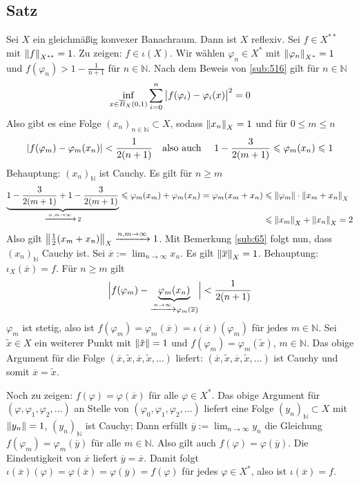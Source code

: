 \subsection[Satz: Gleichmäßig konvexe Banachräume sind reflexiv]{Satz} %
\label{sub:69}
Sei $X$ ein gleichmäßig konvexer Banachraum. Dann ist $X$ reflexiv.
Sei $f \in X^{**}$ mit $\norm[X^{**}]{f}=1$. Zu zeigen: $f \in \iota(X)$. Wir wählen $\varphi_n \in X^*$ mit $\norm[X^*]{\varphi_n}=1$ und $f(\varphi_n) > 1- \frac{1}{n+1}$
für $n \in \mathds{N}$. Nach dem Beweis von \ref{sub:516} gilt für $n \in \mathds{N}$
\[
	\inf_{x \in \overline{B}_X(0,1) } \sum_{i=0}^{n} \,\abs[\big]{f(\varphi_i) - \varphi_i(x)}^2 =0
\]
Also gibt es eine Folge $(x_n)_{n \in \mathds{N}} \subset X$, sodass $\norm[X]{x_n}=1$ und für $0 \le m \le n$
\[
	\abs*{f(\varphi_m)- \varphi_m(x_n)} < \frac{1}{2(n+1)} \quad \text{also auch } \quad 1- \frac{3}{2(m+1)}\le \varphi_m(x_n) \le 1
\]
Behauptung: $(x_n)_\mathds{N}$ ist Cauchy. Es gilt für $n \ge m$
\begin{align*}
	\underbrace{1- \frac{3}{2(m+1)}  + 1 - \frac{3}{2(m+1)}}_{\xrightarrow{n,m \to \infty}\, 2} \le \varphi_m(x_m) + \varphi_m(x_n) = \varphi_m(x_m+x_n) &\le \norm{\varphi_m} \cdot \norm[X]{x_m+x_n} \\[-1.2em]
	&\le \norm[X]{x_m} + \norm[X]{x_n} = 2  
\end{align*}
Also gilt $ \norm[X]{\frac{1}{2} (x_m+x_n)} \xrightarrow{n,m \to \infty} 1$. Mit Bemerkung \ref{sub:65} folgt nun, dass $(x_n)_\mathds{N}$ Cauchy ist. Sei 
$\overline{x} := \lim_{ n \to \infty} x_n$. Es gilt $\norm[X]{\overline{x}}=1$. Behauptung: $\iota_X(\overline{x})=f$. Für $n \ge m$ gilt
\begin{align*}
	\abs[\Big]{f(\varphi_m) - \underbrace{\varphi_m(x_n)}_{\xrightarrow{n \to \infty} \varphi_m(\overline{x} )}} < \frac{1}{2(n+1)}  
\end{align*}
$\varphi_m$ ist stetig, also ist $f(\varphi_m)=\varphi_m(\overline{x})= \iota(\overline{x})(\varphi_m)$ für jedes $m \in\mathds{N}$. Sei $\tilde{x} \in X$ ein weiterer Punkt
mit $\norm{\tilde{x}}=1$ und $f(\varphi_m) = \varphi_m(\tilde{x})$, $m \in \mathds{N}$. Das obige Argument für die Folge 
$(\overline{x}, \tilde{x}, \overline{x}, \tilde{x}, \ldots)$ liefert: $(\overline{x}, \tilde{x}, \overline{x}, \tilde{x}, \ldots)$ ist Cauchy und somit
$\overline{x}=\tilde{x}$.

Noch zu zeigen: $f(\varphi)= \varphi(\overline{x})$ für alle $\varphi \in X^*$. Das obige Argument für $(\varphi, \varphi_1, \varphi_2, \ldots )$ an Stelle von
$(\varphi_0, \varphi_1, \varphi_2,\ldots )$ liefert eine Folge $(y_n)_\mathds{N} \subset X$ mit $\norm{y_n}=1$, $(y_n)_\mathds{N}$ ist Cauchy; 
Dann erfüllt $\overline{y} := \lim_{ n \to \infty} y_n$ die Gleichung $f(\varphi_m)=\varphi_m(\overline{y})$ für alle $m \in \mathds{N}$. Also gilt auch 
$f(\varphi)=\varphi(\overline{y})$. Die Eindeutigkeit von $\overline{x}$ liefert $ \overline{y}=\overline{x}$. Damit folgt 
$\iota(\overline{x})(\varphi)= \varphi(\overline{x})= \varphi(\overline{y})= f(\varphi)$ für jedes $\varphi \in X^*$, also ist $\iota(\overline{x})=f$. \bewende

